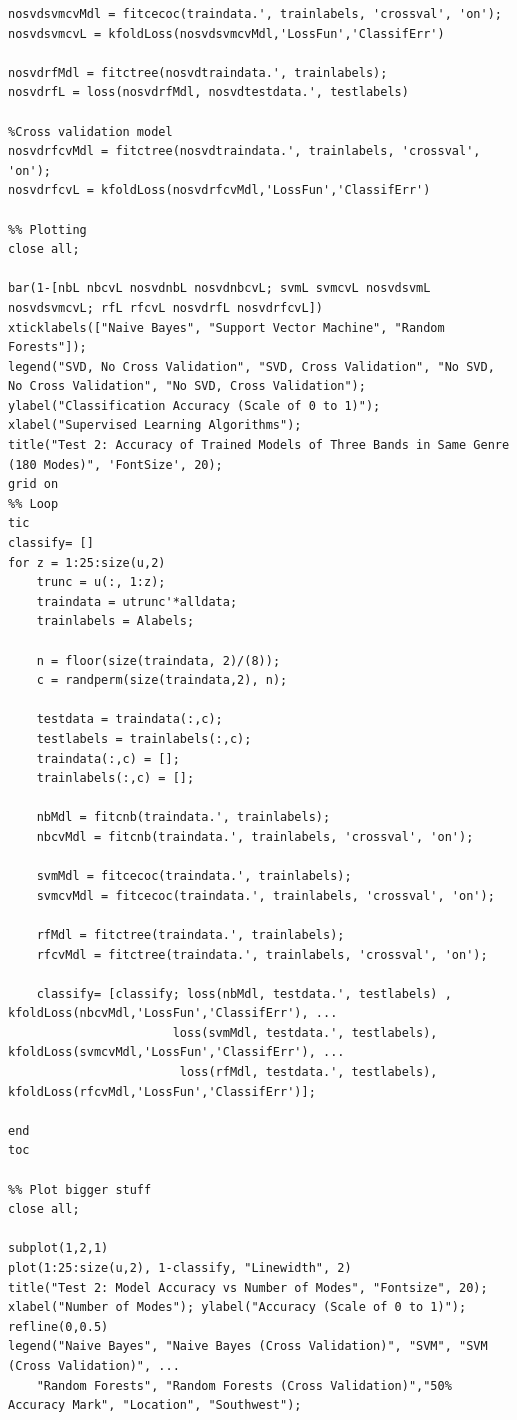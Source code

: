 \documentclass{article}
\begin{document}
\begin{lstlisting}[style=Matlab-editor]
%Cross validation model
nosvdsvmcvMdl = fitcecoc(traindata.', trainlabels, 'crossval', 'on');
nosvdsvmcvL = kfoldLoss(nosvdsvmcvMdl,'LossFun','ClassifErr')

nosvdrfMdl = fitctree(nosvdtraindata.', trainlabels);
nosvdrfL = loss(nosvdrfMdl, nosvdtestdata.', testlabels)

%Cross validation model
nosvdrfcvMdl = fitctree(nosvdtraindata.', trainlabels, 'crossval', 'on');
nosvdrfcvL = kfoldLoss(nosvdrfcvMdl,'LossFun','ClassifErr')

%% Plotting
close all;

bar(1-[nbL nbcvL nosvdnbL nosvdnbcvL; svmL svmcvL nosvdsvmL nosvdsvmcvL; rfL rfcvL nosvdrfL nosvdrfcvL])
xticklabels(["Naive Bayes", "Support Vector Machine", "Random Forests"]);
legend("SVD, No Cross Validation", "SVD, Cross Validation", "No SVD, No Cross Validation", "No SVD, Cross Validation");
ylabel("Classification Accuracy (Scale of 0 to 1)"); xlabel("Supervised Learning Algorithms");
title("Test 2: Accuracy of Trained Models of Three Bands in Same Genre (180 Modes)", 'FontSize', 20);
grid on
%% Loop
tic
classify= []
for z = 1:25:size(u,2)
    trunc = u(:, 1:z);
    traindata = utrunc'*alldata;
    trainlabels = Alabels;
    
    n = floor(size(traindata, 2)/(8));
    c = randperm(size(traindata,2), n);
    
    testdata = traindata(:,c);
    testlabels = trainlabels(:,c);
    traindata(:,c) = [];
    trainlabels(:,c) = [];
    
    nbMdl = fitcnb(traindata.', trainlabels);
    nbcvMdl = fitcnb(traindata.', trainlabels, 'crossval', 'on');

    svmMdl = fitcecoc(traindata.', trainlabels);
    svmcvMdl = fitcecoc(traindata.', trainlabels, 'crossval', 'on');

    rfMdl = fitctree(traindata.', trainlabels);
    rfcvMdl = fitctree(traindata.', trainlabels, 'crossval', 'on');
    
    classify= [classify; loss(nbMdl, testdata.', testlabels) , kfoldLoss(nbcvMdl,'LossFun','ClassifErr'), ...
                       loss(svmMdl, testdata.', testlabels), kfoldLoss(svmcvMdl,'LossFun','ClassifErr'), ...
                        loss(rfMdl, testdata.', testlabels), kfoldLoss(rfcvMdl,'LossFun','ClassifErr')];
                    
end
toc

%% Plot bigger stuff
close all;

subplot(1,2,1)
plot(1:25:size(u,2), 1-classify, "Linewidth", 2)
title("Test 2: Model Accuracy vs Number of Modes", "Fontsize", 20);
xlabel("Number of Modes"); ylabel("Accuracy (Scale of 0 to 1)");
refline(0,0.5)
legend("Naive Bayes", "Naive Bayes (Cross Validation)", "SVM", "SVM (Cross Validation)", ...
    "Random Forests", "Random Forests (Cross Validation)","50% Accuracy Mark", "Location", "Southwest");


\end{lstlisting}
\end{document}
